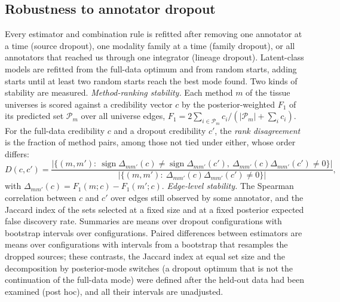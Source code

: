 \documentclass[11pt,a4paper]{article}
\begin{document}
\subsection{Robustness to annotator dropout}\label{sec:robustness}
Every estimator and combination rule is refitted after removing one annotator at a time (source dropout), one modality family at a time (family dropout), or all annotators that reached us through one integrator (lineage dropout).
Latent-class models are refitted from the full-data optimum and from random starts, adding starts until at least two random starts reach the best mode found.
Two kinds of stability are measured.
\emph{Method-ranking stability.} Each method $m$ of the tissue universes is scored against a credibility vector $c$ by the posterior-weighted $F_1$ of its predicted set $\mathcal{P}_m$ over all universe edges, $F_1=2\sum_{i\in\mathcal{P}_m}c_i/(|\mathcal{P}_m|+\sum_i c_i)$. For the full-data credibility $c$ and a dropout credibility $c'$, the \emph{rank disagreement} is the fraction of method pairs, among those not tied under either, whose order differs:
\begin{equation}
  D(c,c')=\frac{\big|\{(m,m'):\ \operatorname{sign}\Delta_{mm'}(c)\neq\operatorname{sign}\Delta_{mm'}(c'),\ \Delta_{mm'}(c)\Delta_{mm'}(c')\neq 0\}\big|}{\big|\{(m,m'):\ \Delta_{mm'}(c)\Delta_{mm'}(c')\neq 0\}\big|},
  \label{eq:rankdisagreement}
\end{equation}
with $\Delta_{mm'}(c)=F_1(m;c)-F_1(m';c)$.
\emph{Edge-level stability.} The Spearman correlation between $c$ and $c'$ over edges still observed by some annotator, and the Jaccard index of the sets selected at a fixed size and at a fixed posterior expected false discovery rate.
Summaries are means over dropout configurations with bootstrap intervals over configurations. Paired differences between estimators are means over configurations with intervals from a bootstrap that resamples the dropped sources; these contrasts, the Jaccard index at equal set size and the decomposition by posterior-mode switches (a dropout optimum that is not the continuation of the full-data mode) were defined after the held-out data had been examined (post hoc), and all their intervals are unadjusted.
\end{document}
